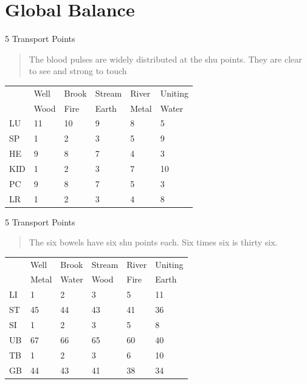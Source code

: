 \section{Global Balance}

\begin{frame}{5 Transport Points}

\begin{quote}
The blood pulses are widely distributed at the shu points. They are clear to see and strong to touch
\end{quote}

\begin{table}[]
\begin{tabular}{@{}llllll@{}}
    & Well & Brook & Stream & River & Uniting \\
    & Wood & Fire  & Earth  & Metal & Water   \\
LU  & 11   & 10    & 9      & 8     & 5       \\
SP  & 1    & 2     & 3      & 5     & 9       \\
HE  & 9    & 8     & 7      & 4     & 3       \\
KID & 1    & 2     & 3      & 7     & 10      \\
PC  & 9    & 8     & 7      & 5     & 3       \\
LR  & 1    & 2     & 3      & 4     & 8      
\end{tabular}
\end{table}

\end{frame}

\begin{frame}{5 Transport Points}

\begin{quote}
The six bowels have six shu points each. Six times six is thirty six. 
\end{quote}

\begin{table}[]
\begin{tabular}{@{}llllll@{}}
   & Well  & Brook & Stream & River & Uniting \\
   & Metal & Water & Wood   & Fire  & Earth   \\
LI & 1     & 2     & 3      & 5     & 11      \\
ST & 45    & 44    & 43     & 41    & 36      \\
SI & 1     & 2     & 3      & 5     & 8       \\
UB & 67    & 66    & 65     & 60    & 40      \\
TB & 1     & 2     & 3      & 6     & 10      \\
GB & 44    & 43    & 41     & 38    & 34     
\end{tabular}
\end{table}

\end{frame}


